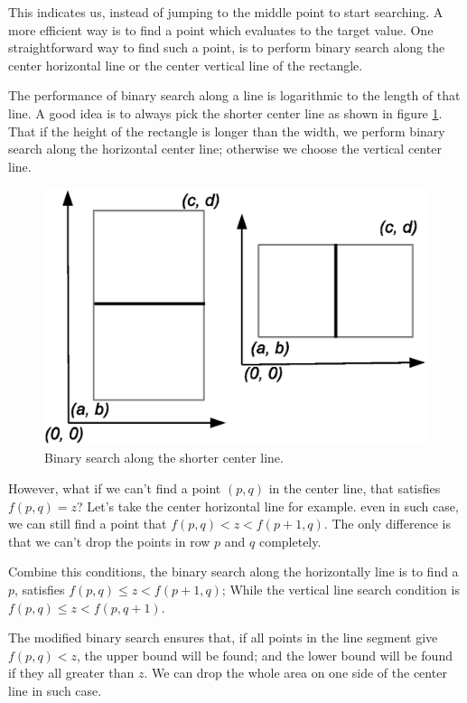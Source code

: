 \documentclass[UTF8]{article}
\begin{document}
This indicates us, instead of jumping to the middle point to start searching. A more efficient way is to find
a point which evaluates to the target value. One straightforward way to find such a point, is to perform
binary search along the center horizontal line or the center vertical line of the rectangle.

The performance of binary search along a line is logarithmic to the length of that line. A good idea is to always pick the shorter
center line as shown in figure \ref{fig:saddleback-centerline}. That if the height of the rectangle is longer
than the width, we perform binary search along the horizontal center line; otherwise we choose the vertical
center line.

\begin{figure}[htbp]
 \centering
 \includegraphics[scale=0.5]{img/saddleback-centerline.eps}
 \caption{Binary search along the shorter center line.}
 \label{fig:saddleback-centerline}
\end{figure}

However, what if we can't find a point $(p, q)$ in the center line, that satisfies $f(p, q) = z$? Let's take
the center horizontal line for example. even in such case, we can still find a point that
$f(p, q) < z < f(p+1, q)$. The only difference is that we can't drop the points in row $p$ and $q$ completely.

Combine this conditions, the binary search along the horizontally line is to find a $p$, satisfies
$f(p, q) \leq z < f(p+1, q)$; While the vertical line search condition is $f(p, q) \leq z < f(p, q + 1)$.

The modified binary search ensures that, if all points in the line segment give $f(p, q) < z$, the upper
bound will be found; and the lower bound will be found if they all greater than $z$. We can drop the
whole area on one side of the center line in such case.
\end{document}
